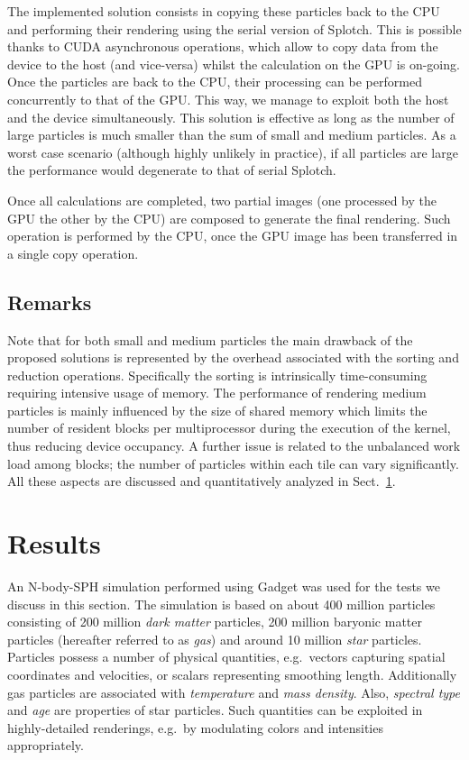 \documentclass[preprint,5pt]{elsarticle}
\begin{document}
The implemented solution consists in copying these particles back to the CPU and performing their rendering
using the serial version of Splotch. This is possible thanks to CUDA asynchronous
operations, which allow to copy data from the device to the host (and vice-versa)
whilst the calculation on the GPU is on-going. Once the particles are back to the CPU,
their processing can be performed concurrently to that of the GPU.  
This way, we manage to exploit both the host and the device simultaneously.
This solution is effective as long as the number of large particles
is much smaller than the sum of small and medium particles. As a worst case scenario (although highly unlikely in practice), if all particles are large the performance would degenerate to that of serial Splotch.

Once all calculations are completed, two partial images (one processed by the GPU the other by the CPU) are composed to generate the final rendering. Such operation is performed by the CPU, once the GPU image has been transferred in a single copy operation. 

\subsection{Remarks}
Note that for both small and medium particles the main drawback of the proposed solutions
is represented by the overhead associated with the sorting and reduction operations. Specifically the sorting is intrinsically time-consuming requiring intensive usage of memory.
The performance of rendering medium particles is mainly influenced
by the size of shared memory which limits the number of resident blocks
per multiprocessor during the execution of the kernel, thus reducing device occupancy. 
A further issue is related to the unbalanced work load among blocks; the number of particles within each tile can vary significantly. All these aspects are discussed and quantitatively analyzed in Sect.~\ref{sec:results}.

\section{Results}
\label{sec:results}

An N-body-SPH simulation performed using Gadget \cite{gadgeturl} was used for the tests we discuss in this section. The simulation is based on about 400 million particles consisting of 200 million {\it dark matter} particles, 200 million baryonic matter particles (hereafter referred to as {\it gas}) and around 10 million {\it star} particles. Particles possess a number of physical quantities, e.g.\ vectors capturing spatial coordinates and velocities, or scalars representing smoothing length. Additionally gas particles are associated with {\it temperature} and {\it mass density}. Also, {\it spectral type} and {\it age} are properties of star particles. Such quantities can be exploited in highly-detailed renderings, e.g.\ by modulating colors and intensities appropriately. 
\end{document}
